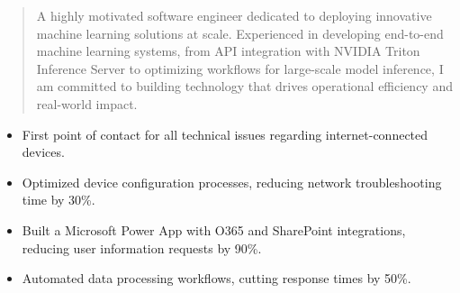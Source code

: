 



\makecvheader

\begin{quote}
  \noindent
  A highly motivated software engineer dedicated to deploying innovative machine learning solutions at scale. Experienced in developing end-to-end machine learning systems, from API integration with NVIDIA Triton Inference Server to optimizing workflows for large-scale model inference, I am committed to building technology that drives operational efficiency and real-world impact.
\end{quote}

\par\smallskip
\noindent
\begin{minipage}{20cm}
  \begin{minipage}{9.75cm}
    \begin{itemize}
      \item First point of contact for all technical issues regarding internet-connected devices.
      \item Optimized device configuration processes, reducing network troubleshooting time by 30\%.
    \end{itemize}
  \end{minipage}
  \hfill
  \begin{minipage}{9.75cm}
    \begin{itemize}
      \item Built a Microsoft Power App with O365 and SharePoint integrations, reducing user information requests by 90\%.
      \item Automated data processing workflows, cutting response times by 50\%.
    \end{itemize}
  \end{minipage}
\end{minipage}
\par\smallskip
\divider

